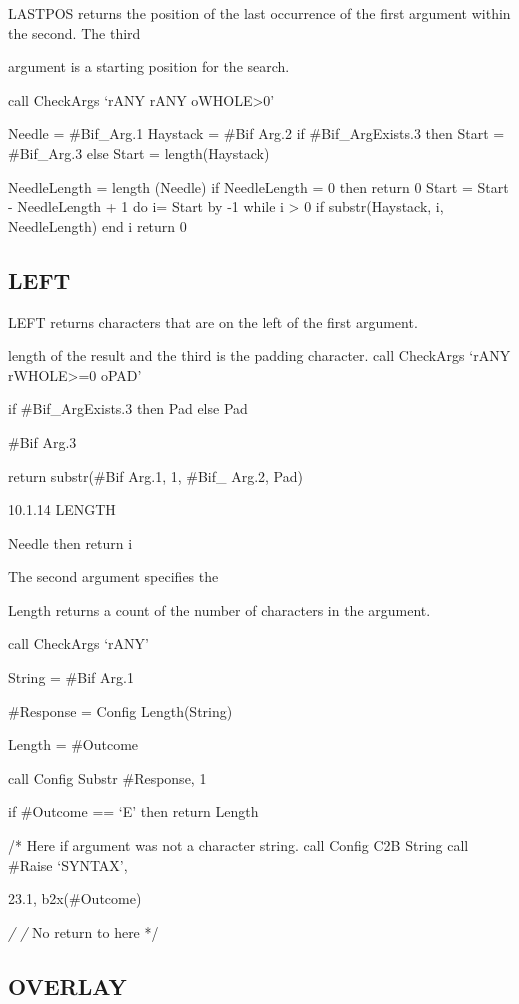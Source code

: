 LASTPOS returns the position of the last occurrence of the first
argument within the second. The third

argument is a starting position for the search.

call CheckArgs `rANY rANY oWHOLE\textgreater0'

Needle = \#Bif\_Arg.1 Haystack = \#Bif Arg.2 if \#Bif\_ArgExists.3 then
Start = \#Bif\_Arg.3 else Start = length(Haystack)

NeedleLength = length (Needle) if NeedleLength = 0 then return 0 Start =
Start - NeedleLength + 1 do i= Start by -1 while i \textgreater{} 0 if
substr(Haystack, i, NeedleLength) end i return 0

\subsection{LEFT}\label{left}

LEFT returns characters that are on the left of the first argument.

length of the result and the third is the padding character. call
CheckArgs `rANY rWHOLE\textgreater=0 oPAD'

if \#Bif\_ArgExists.3 then Pad else Pad

\#Bif Arg.3

return substr(\#Bif Arg.1, 1, \#Bif\_ Arg.2, Pad)

10.1.14 LENGTH

Needle then return i

The second argument specifies the

Length returns a count of the number of characters in the argument.

call CheckArgs `rANY'

String = \#Bif Arg.1

\#Response = Config Length(String)

Length = \#Outcome

call Config Substr \#Response, 1

if \#Outcome == `E' then return Length

/* Here if argument was not a character string. call Config C2B String
call \#Raise `SYNTAX',

23.1, b2x(\#Outcome)

\emph{/ /} No return to here */

\subsection{OVERLAY}\label{overlay}

